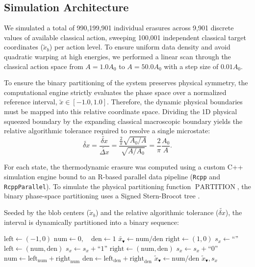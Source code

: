 \documentclass[%
  aps, reprint, prl, amsmath,amssymb
]{revtex4-2}
\begin{document}
\subsection{Simulation Architecture}

We simulated a total of 990,199,901 individual erasures across 9,901 discrete values of available classical action, sweeping 100,001 independent classical target coordinates ($\tilde{x}_b$) per action level. To ensure uniform data density and avoid quadratic warping at high energies, we performed a linear scan through the classical action space from $A = 1.0 A_0$ to $A = 50.0 A_0$ with a step size of $0.01 A_0$.

To ensure the binary partitioning of the system preserves physical symmetry, the computational engine strictly evaluates the phase space over a normalized reference interval, $\tilde{x} \in [-1.0, 1.0]$. Therefore, the dynamic physical boundaries must be mapped into this relative coordinate space. Dividing the 1D physical squeezed boundary by the expanding classical macroscopic boundary yields the relative algorithmic tolerance required to resolve a single microstate:
\begin{equation}
\widetilde{\delta x} = \frac{\widetilde{\delta x}}{\widetilde{\Delta x}} = \frac{\frac{2}{\pi}\sqrt{A_0/A}}{\sqrt{A/A_0}} = \frac{2}{\pi} \frac{A_0}{A}.
\end{equation}
 
 For each state, the thermodynamic erasure was computed using a custom C++ simulation engine bound to an R-based parallel data pipeline (\texttt{Rcpp} and \texttt{RcppParallel}). To simulate the physical partitioning function $\operatorname{PARTITION}$, the binary phase-space partitioning uses a Signed Stern-Brocot tree \cite{ConcreteMath, Niqui2007}.

Seeded by the blob centers ($\tilde{x}_b$) and the relative algorithmic tolerance ($\widetilde{\delta x}$), the interval is dynamically partitioned into a binary sequence:

\begin{algorithmic}[1]
    \State $\text{left} \gets (-1, 0)$
    \State $\text{num} \gets 0, \quad \text{den} \gets 1$
    \State $\widetilde{x_\blacktriangledown} \gets \text{num} / \text{den}$
    \State $\text{right} \gets (1, 0)$
    \State $s_x \gets \text{``''}$
            \State $\text{left} \gets (\text{num}, \text{den})$
            \State $s_x \gets s_x + \text{``1''}$
        \Else 
            \State $\text{right} \gets (\text{num}, \text{den})$
            \State $s_x \gets s_x + \text{``0''}$
        \EndIf
        \State $\text{num} \gets \text{left}_{\text{num}} + \text{right}_{\text{num}}$
        \State $\text{den} \gets \text{left}_{\text{den}} + \text{right}_{\text{den}}$
        \State $\tilde{x}_\blacktriangledown \gets \text{num} / \text{den}$
    \EndWhile
    \State \Return $\tilde{x}_\blacktriangledown, s_x$
\EndFunction
\end{algorithmic}
\end{document}
